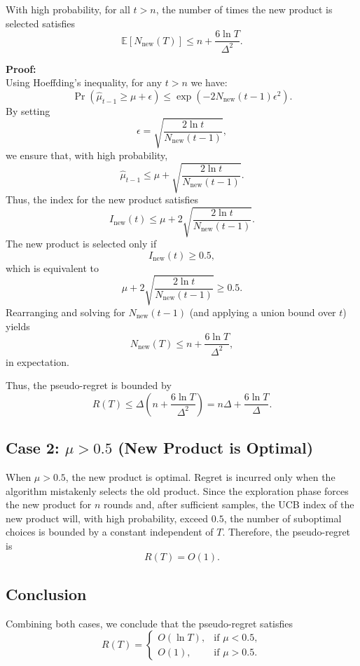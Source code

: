 With high probability, for all \(t > n\), the number of times the new product is selected satisfies
\[
\mathbb{E}\left[N_{\text{new}}(T)\right] \leq n + \frac{6 \ln T}{\Delta^2}.
\]

\textbf{Proof:}\\[1ex]
Using Hoeffding's inequality, for any \(t > n\) we have:
\[
\Pr\left(\hat{\mu}_{t-1} \geq \mu + \epsilon\right) \leq \exp\left(-2N_{\text{new}}(t-1)\epsilon^2\right).
\]
By setting
\[
\epsilon = \sqrt{\frac{2\ln t}{N_{\text{new}}(t-1)}},
\]
we ensure that, with high probability,
\[
\hat{\mu}_{t-1} \leq \mu + \sqrt{\frac{2\ln t}{N_{\text{new}}(t-1)}}.
\]
Thus, the index for the new product satisfies
\[
I_{\text{new}}(t) \leq \mu + 2\sqrt{\frac{2\ln t}{N_{\text{new}}(t-1)}}.
\]
The new product is selected only if
\[
I_{\text{new}}(t) \geq 0.5,
\]
which is equivalent to
\[
\mu + 2\sqrt{\frac{2\ln t}{N_{\text{new}}(t-1)}} \geq 0.5.
\]
Rearranging and solving for \(N_{\text{new}}(t-1)\) (and applying a union bound over \(t\)) yields
\[
N_{\text{new}}(T) \leq n + \frac{6\ln T}{\Delta^2},
\]
in expectation.

Thus, the pseudo-regret is bounded by
\[
R(T) \leq \Delta \left(n + \frac{6\ln T}{\Delta^2}\right) = n\Delta + \frac{6\ln T}{\Delta}.
\]

\subsection*{Case 2: \(\mu > 0.5\) (New Product is Optimal)}

When \(\mu > 0.5\), the new product is optimal. Regret is incurred only when the algorithm mistakenly selects the old product. Since the exploration phase forces the new product for \(n\) rounds and, after sufficient samples, the UCB index of the new product will, with high probability, exceed \(0.5\), the number of suboptimal choices is bounded by a constant independent of \(T\). Therefore, the pseudo-regret is
\[
R(T) = O(1).
\]

\subsection*{Conclusion}

Combining both cases, we conclude that the pseudo-regret satisfies
\[
R(T) =
\begin{cases}
O\left(\ln T\right), & \text{if } \mu < 0.5, \\
O(1), & \text{if } \mu > 0.5.
\end{cases}
\]